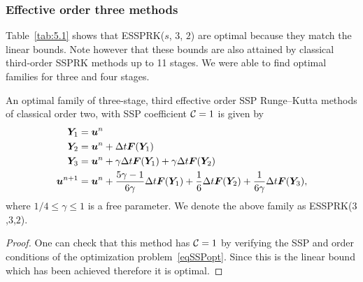 \subsubsection{Effective order three methods}\label{subsubsection3.4.1}



Table~\ref{tab:5.1} shows that ESSPRK($s$, $3$, $2$) are optimal
because they match the linear bounds.
Note however that these bounds are also attained by classical
third-order SSPRK methods up to 11 stages.
We were able to find optimal families for three and four stages.

\begin{theorem}\label{thm:ESSPRK(3,3,2)}
  An optimal family of three-stage, third effective order
  SSP Runge--Kutta methods of classical order two, with SSP
  coefficient $\mathcal{C}=1$ is given by
    \begin{displaymath}
        \begin{split}
            \bm{Y}_{1} &= \bm{u}^{n} \\
            \bm{Y}_{2} &= \bm{u}^{n} + \Delta t\bm{F}(\bm{Y}_{1}) \\
            \bm{Y}_{3} &= \bm{u}^{n} + \gamma\Delta t\bm{F}(\bm{Y}_{1}) + \gamma\Delta t\bm{F}(\bm{Y}_{2}) \\
            \bm{u}^{n+1} &= \bm{u}^{n} + \frac{5\gamma-1}{6\gamma}\Delta t\bm{F}(\bm{Y}_{1}) + \frac{1}{6}\Delta t\bm{F}(\bm{Y}_{2}) + \frac{1}{6\gamma}\Delta t\bm{F}(\bm{Y}_{3}),
        \end{split}
    \end{displaymath}
    where \( 1/4 \leq \gamma \leq 1 \) is a free parameter. We denote the above family as ESSPRK($3$,$3$,$2$).
\end{theorem}

\begin{proof}
One can check that this method has $\mathcal{C} = 1$ by verifying the SSP and order conditions of the optimization problem~\eqref{eqSSPopt}. Since this is the linear bound which has been achieved therefore it is optimal.
\end{proof}

